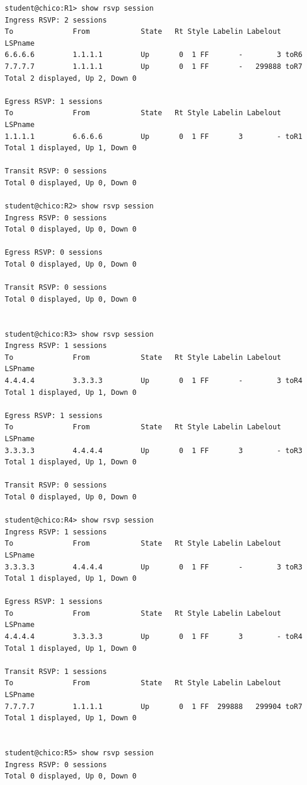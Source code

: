 \documentclass[a4paper]{article}
\begin{document}
\begin{verbatim}
student@chico:R1> show rsvp session 
Ingress RSVP: 2 sessions
To              From            State   Rt Style Labelin Labelout LSPname 
6.6.6.6         1.1.1.1         Up       0  1 FF       -        3 toR6
7.7.7.7         1.1.1.1         Up       0  1 FF       -   299888 toR7
Total 2 displayed, Up 2, Down 0

Egress RSVP: 1 sessions
To              From            State   Rt Style Labelin Labelout LSPname 
1.1.1.1         6.6.6.6         Up       0  1 FF       3        - toR1
Total 1 displayed, Up 1, Down 0

Transit RSVP: 0 sessions
Total 0 displayed, Up 0, Down 0

student@chico:R2> show rsvp session 
Ingress RSVP: 0 sessions
Total 0 displayed, Up 0, Down 0

Egress RSVP: 0 sessions
Total 0 displayed, Up 0, Down 0

Transit RSVP: 0 sessions
Total 0 displayed, Up 0, Down 0


student@chico:R3> show rsvp session                          
Ingress RSVP: 1 sessions
To              From            State   Rt Style Labelin Labelout LSPname 
4.4.4.4         3.3.3.3         Up       0  1 FF       -        3 toR4
Total 1 displayed, Up 1, Down 0

Egress RSVP: 1 sessions
To              From            State   Rt Style Labelin Labelout LSPname 
3.3.3.3         4.4.4.4         Up       0  1 FF       3        - toR3
Total 1 displayed, Up 1, Down 0

Transit RSVP: 0 sessions
Total 0 displayed, Up 0, Down 0

student@chico:R4> show rsvp session            
Ingress RSVP: 1 sessions
To              From            State   Rt Style Labelin Labelout LSPname 
3.3.3.3         4.4.4.4         Up       0  1 FF       -        3 toR3
Total 1 displayed, Up 1, Down 0

Egress RSVP: 1 sessions
To              From            State   Rt Style Labelin Labelout LSPname 
4.4.4.4         3.3.3.3         Up       0  1 FF       3        - toR4
Total 1 displayed, Up 1, Down 0

Transit RSVP: 1 sessions
To              From            State   Rt Style Labelin Labelout LSPname 
7.7.7.7         1.1.1.1         Up       0  1 FF  299888   299904 toR7
Total 1 displayed, Up 1, Down 0


student@chico:R5> show rsvp session            
Ingress RSVP: 0 sessions
Total 0 displayed, Up 0, Down 0


\end{verbatim}
\end{document}
